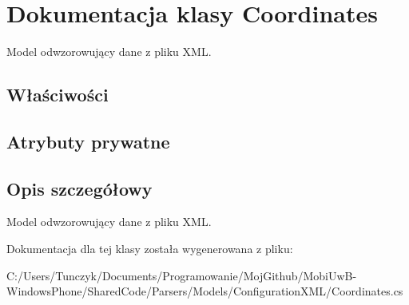 \hypertarget{a00015}{}\section{Dokumentacja klasy Coordinates}
\label{a00015}


Model odwzorowujący dane z pliku X\+M\+L.  


\subsection*{Właściwości}
\subsection*{Atrybuty prywatne}


\subsection{Opis szczegółowy}
Model odwzorowujący dane z pliku X\+M\+L. 



Dokumentacja dla tej klasy została wygenerowana z pliku\+:\begin{DoxyCompactItemize}
\item 
C\+:/\+Users/\+Tunczyk/\+Documents/\+Programowanie/\+Moj\+Github/\+Mobi\+Uw\+B-\/\+Windows\+Phone/\+Shared\+Code/\+Parsers/\+Models/\+Configuration\+X\+M\+L/Coordinates.\+cs\end{DoxyCompactItemize}
